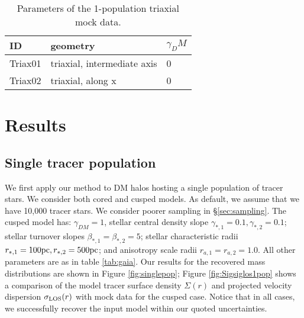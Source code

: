 \begin{table}
    \label{tab:triax}
    \caption{Parameters of the 1-population triaxial mock data.}
    \centering
    \begin{tabular}{lll}
        ID & geometry & $\gamma_DM$\\
        \hline
        Triax01 & triaxial, intermediate axis & 0\\
        Triax02 & triaxial, along x & 0 \\
    \end{tabular}
\end{table}

\section{Results}\label{sec:results}
\subsection{Single tracer population}

We first apply our method to DM halos hosting a single population of
tracer stars. We consider both cored and cusped models. As default, we
assume that we have 10,000 tracer stars. We consider poorer sampling
in \S\ref{sec:sampling}. The cusped model has: $\gamma_{DM}=1$,
stellar central density slope $\gamma_{*,1}=0.1, \gamma_{*,2}=0.1$;
stellar turnover slopes $\beta_{*,1}=\beta_{*,2}=5$; stellar
characteristic radii $r_{*,1}=100\mathrm{pc}, r_{*,2}=500\mathrm{pc}$; and anisotropy
scale radii $r_{a,1}=r_{a,2}=1.0$. All other parameters are as in
table \ref{tab:gaia}. Our results for the recovered mass distributions
are shown in Figure \ref{fig:singlepop}; Figure
\ref{fig:Sigsiglos1pop} shows a comparison of the model tracer surface
density $\Sigma(r)$ and projected velocity dispersion $\sigma_{\text{LOS}}(r)$
with mock data for the cusped case. Notice that in all cases, we
successfully recover the input model within our quoted uncertainties.



